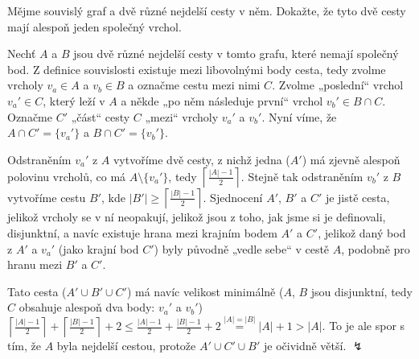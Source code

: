 \documentclass[12pt]{article}					%
\begin{document}
\begin{priklad}[2]
    Mějme souvislý graf a dvě různé nejdelší cesty v něm. Dokažte, že tyto dvě cesty mají alespoň jeden společný vrchol.

    \begin{dukaz}[Sporem]
        Nechť $A$ a $B$ jsou dvě různé nejdelší cesty v tomto grafu, které nemají společný bod. Z definice souvislosti existuje mezi libovolnými body cesta, tedy zvolme vrcholy $v_a \in A$ a $v_b \in B$ a označme cestu mezi nimi $C$. Zvolme „poslední“ vrchol $v_a' \in C$, který leží v $A$ a někde „po něm následuje první“ vrchol $v_b' \in B \cap C$. Označme $C'$ „část“ cesty $C$ „mezi“ vrcholy $v_a'$ a $v_b'$. Nyní víme, že $A \cap C' = \{v_a'\}$ a $B \cap C' = \{v_b'\}$.

        Odstraněním $v_a'$ z $A$ vytvoříme dvě cesty, z nichž jedna ($A'$) má zjevně alespoň polovinu vrcholů, co má $A \setminus \{v_a'\}$, tedy $\left\lceil\frac{|A|-1}{2}\right\rceil$. Stejně tak odstraněním $v_b'$ z $B$ vytvoříme cestu $B'$, kde $|B'| ≥ \left\lceil\frac{|B|-1}{2}\right\rceil$. Sjednocení $A'$, $B'$ a $C'$ je jistě cesta, jelikož vrcholy se v ní neopakují, jelikož jsou z toho, jak jsme si je definovali, disjunktní, a navíc existuje hrana mezi krajním bodem $A'$ a $C'$, jelikož daný bod z $A'$ a $v_a'$ (jako krajní bod $C'$) byly původně „vedle sebe“ v cestě $A$, podobně pro hranu mezi $B'$ a $C'$.

        Tato cesta ($A'\cup B' \cup C'$) má navíc velikost minimálně ($A$, $B$ jsou disjunktní, tedy $C$ obsahuje alespoň dva body: $v_a'$ a $v_b'$) $\left\lceil\frac{|A|-1}{2}\right\rceil + \left\lceil\frac{|B|-1}{2}\right\rceil + 2 ≤ \frac{|A|-1}{2} + \frac{|B|-1}{2} + 2 \overset{|A|=|B|}{=} |A| + 1 > |A|$. To je ale spor s tím, že $A$ byla nejdelší cestou, protože $A' \cup C' \cup B'$ je očividně větší. $\lightning$
    \end{dukaz}
\end{priklad}
\end{document}
